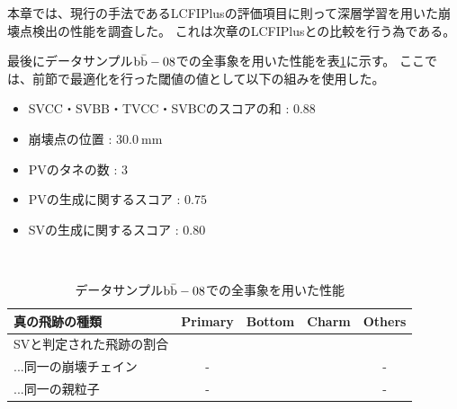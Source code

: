 本章では、現行の手法であるLCFIPlusの評価項目に則って深層学習を用いた崩壊点検出の性能を調査した。
これは次章のLCFIPlusとの比較を行う為である。

最後にデータサンプル$\rm b\bar{b}-08$での全事象を用いた性能を表\ref{PerformanceofAllEvents}に示す。
ここでは、前節で最適化を行った閾値の値として以下の組みを使用した。

\begin{itemize}
 \item SVCC・SVBB・TVCC・SVBCのスコアの和 : $0.88$
 \item 崩壊点の位置 : $30.0\ {\mathrm{mm}}$
 \item PVのタネの数 : $3$
 \item PVの生成に関するスコア : $0.75$
 \item SVの生成に関するスコア : $0.80$
\end{itemize}

\begin{table}[htb]
 \centering
　\small
  \begin{tabular}{l c c c c} \hline
    真の飛跡の種類 & Primary & Bottom & Charm & Others\\ \hline
    SVと判定された飛跡の割合 &  &  &  &\\
    ...同一の崩壊チェイン & - &  &  & - \\
    ...同一の親粒子 & - &  &  & - \\\hline
  \end{tabular}
  \caption{データサンプル$\rm b\bar{b}-08$での全事象を用いた性能}
  \label{PerformanceofAllEvents}
\end{table}



























